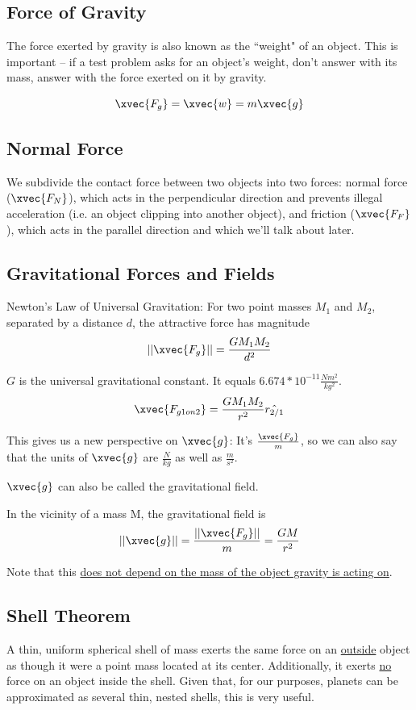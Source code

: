 \documentclass{article}
\begin{document}
\subsection {Force of Gravity}
The force exerted by gravity is also known as the ``weight" of an object. This is important -- if a test problem asks for an object's weight, don't answer with its mass, answer with the force exerted
on it by gravity.

$$ \xvec{F_g} = \xvec{w} = m\xvec{g} $$

\subsection {Normal Force}
We subdivide the contact force between two objects into two forces: normal force ($ \xvec{F_N} $), which acts in the perpendicular direction and prevents illegal acceleration (i.e. an object clipping into another object),
and friction ($\xvec{F_F}$), which acts in the parallel direction and which we'll talk about later.

\subsection {Gravitational Forces and Fields}
Newton's Law of Universal Gravitation:
For two point masses $ M_1 $ and $ M_2 $, separated by a distance $ d $, the attractive force has magnitude
$$ ||\xvec{F_g}|| = \frac{G M_1 M_2}{d^2} $$

$ G $ is the universal gravitational constant. It equals $ 6.674 * 10^{-11} \frac{N m^2}{kg^2} $.
$$ \xvec{F_{g1on2}} = \frac{GM_1M_2}{r^2}\hat{r_{2/1}} $$

This gives us a new perspective on $ \xvec{g} $: It's $ \frac{\xvec{F_{g}}}{m} $, so we can also say that the units of $ \xvec{g} $ are $ \frac{N}{kg} $ as well as $ \frac{m}{s^2} $.

$\xvec{g}$ can also be called the gravitational field.

In the vicinity of a mass M, the gravitational field is
$$ ||\xvec{g}|| = \frac{||\xvec{F_g}||}{m} = \frac{GM}{r^2} $$

Note that this \uline{does not depend on the mass of the object gravity is acting on}.

\subsection {Shell Theorem}
A thin, uniform spherical shell of mass exerts the same force on an \uline{outside} object as though it were a point mass located at its center. Additionally, it exerts
\uline{no} force on an object inside the shell. Given that, for our purposes, planets can be approximated as several thin, nested shells, this is very useful.
\end{document}
